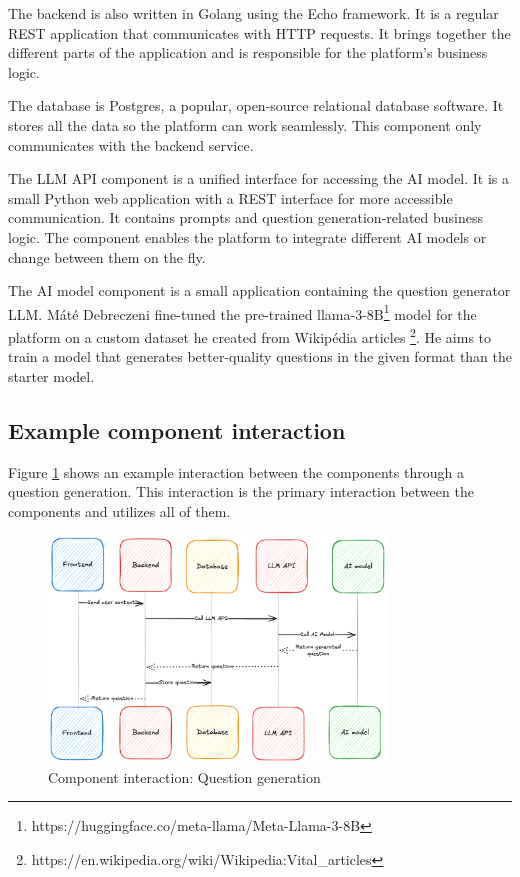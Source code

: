 The backend is also written in Golang using the Echo framework. It is a regular REST application that communicates with HTTP requests. It brings together the different parts of the application and is responsible for the platform's business logic.

The database is Postgres, a popular, open-source relational database software. It stores all the data so the platform can work seamlessly. This component only communicates with the backend service.

The LLM API component is a unified interface for accessing the AI model. It is a small Python web application with a REST interface for more accessible communication. It contains prompts and question generation-related business logic. The component enables the platform to integrate different AI models or change between them on the fly.

The AI model component is a small application containing the question generator LLM. Máté Debreczeni fine-tuned the pre-trained llama-3-8B\footnote{https://huggingface.co/meta-llama/Meta-Llama-3-8B} model for the platform on a custom dataset he created from Wikipédia articles \footnote{https://en.wikipedia.org/wiki/Wikipedia:Vital_articles}. He aims to train a model that generates better-quality questions in the given format than the starter model.  

\subsection{Example component interaction}

Figure \ref{fig:component-interaction} shows an example interaction between the components through a question generation. This interaction is the primary interaction between the components and utilizes all of them.

\begin{figure}[!h]
    \centering
    \includegraphics[width=0.8\textwidth, keepaspectratio]{figures/component-interaction.png}
    \caption{Component interaction: Question generation}
    \label{fig:component-interaction}
\end{figure}

